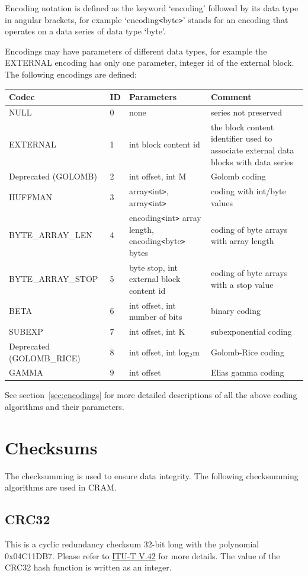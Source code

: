 \documentclass[a4paper]{article}
\begin{document}
Encoding notation is defined as the keyword `encoding' followed by its data type 
in angular brackets, for example `encoding\texttt{<}byte\texttt{>}' stands for 
an encoding that operates on a data series of data type `byte'. 

Encodings may have parameters of different data types, for example the EXTERNAL 
encoding has only one parameter, integer id of the external block. The following 
encodings are defined: 

\begin{tabular}{|l|l|>{\raggedright}p{155pt}|>{\raggedright}p{160pt}|}
\hline
\textbf{Codec} & \textbf{ID} & \textbf{Parameters} & \textbf{Comment}\tabularnewline
\hline
NULL & 0 & none & series not preserved\tabularnewline
\hline
EXTERNAL & 1 & int block content id & the block content identifier used to associate 
external data blocks with data series\tabularnewline
\hline
Deprecated (GOLOMB) & 2 & int offset, int M & Golomb coding\tabularnewline
\hline
HUFFMAN & 3 & array\texttt{<}int\texttt{>}, array\texttt{<}int\texttt{>} & coding with int/byte values\tabularnewline
\hline
BYTE\_ARRAY\_LEN & 4 & encoding\texttt{<}int\texttt{>} array length, encoding\texttt{<}byte\texttt{>} 
bytes & coding of byte arrays with array length\tabularnewline
\hline
BYTE\_ARRAY\_STOP & 5 & byte stop, int external block\linebreak{}
content id & coding of byte arrays with a stop value \tabularnewline
\hline
BETA & 6 & int offset, int number of bits & binary coding\tabularnewline
\hline
SUBEXP & 7 & int offset, int K & subexponential coding\tabularnewline
\hline
Deprecated (GOLOMB\_RICE) & 8 & int offset, int log$_{\text{2}}$m & Golomb-Rice coding\tabularnewline
\hline
GAMMA & 9 & int offset & Elias gamma coding\tabularnewline
\hline
\end{tabular}

See section~\ref{sec:encodings} for more detailed descriptions of all the above coding algorithms and their parameters.

\section{\textbf{Checksums}}
The checksumming is used to ensure data integrity. The following checksumming algorithms are used in CRAM.
\subsection{\textbf{CRC32}}
This is a cyclic redundancy checksum 32-bit long with the polynomial 0x04C11DB7. Please refer to \href{http://www.itu.int/rec/recommendation.asp?type=folders&lang=e&parent=T-REC-V.42}{ITU-T V.42} for more details. The value of the CRC32 hash function is written as an integer.
\end{document}
